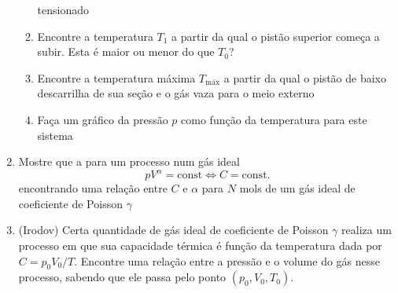 \begin{enumerate}
\begin{enumerate}
                tensionado
            \item
                Encontre a temperatura $T_1$ a partir da qual o pistão superior
                começa a subir. Esta é maior ou menor do que $T_0$?
            \item
                Encontre a temperatura máxima $T_\text{máx}$ a partir da qual o
                pistão de baixo descarrilha de sua seção e o gás vaza para o
                meio externo
            \item
                Faça um gráfico da pressão $p$ como função da temperatura para
                este sistema
        \end{enumerate}

    \item
        Mostre que a para um processo num gás ideal
        $$pV^\alpha=\text{const}\Leftrightarrow C=\text{const}.$$
        encontrando uma relação entre $C$ e $\alpha$ para $N$ mols de um gás
        ideal de coeficiente de Poisson $\gamma$

    \item
        (Irodov) Certa quantidade de gás ideal de coeficiente de Poisson
        $\gamma$ realiza um processo em que sua capacidade térmica é função da
        temperatura dada por $C=p_0V_0/T$. Encontre uma relação entre a pressão
        e o volume do gás nesse processo, sabendo que ele passa pelo ponto
        $(p_0,V_0,T_0)$.


\end{enumerate}
